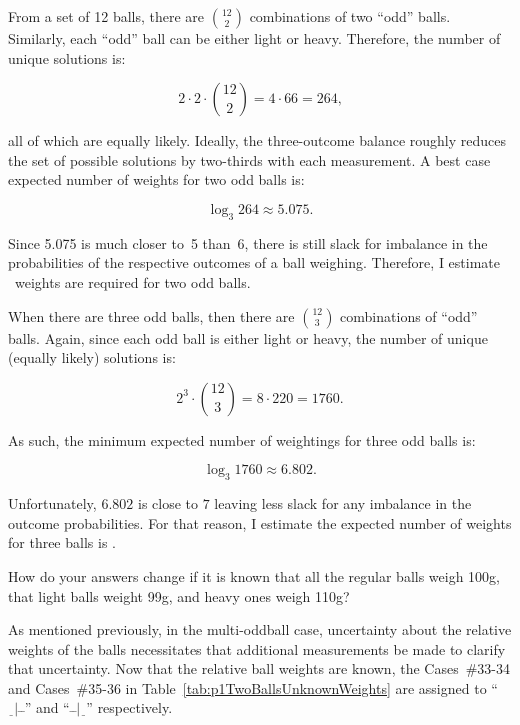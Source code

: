   From a set of 12 balls, there are $\binom{12}{2}$ combinations of two ``odd'' balls.  Similarly, each ``odd'' ball can be either light or heavy.  Therefore, the number of unique solutions is:

  \[ 2\cdot 2 \cdot \binom{12}{2} = 4 \cdot 66 = 264 \text{,} \]

  \noindent
  all of which are equally likely.  Ideally, the three-outcome balance roughly reduces the set of possible solutions by two-thirds with each measurement.  A best case expected number of weights for two odd balls is:

  \[ \log_{3} 264\approx 5.075 {.} \]

  Since 5.075 is much closer to~5 than~6, there is still slack for imbalance in the probabilities of the respective outcomes of a ball weighing.  Therefore, I estimate ~weights are required for two odd balls.

  When there are three odd balls, then there are $\binom{12}{3}$ combinations of ``odd'' balls.  Again, since each odd ball is either light or heavy, the number of unique (equally likely) solutions is:

  \[ 2^3 \cdot \binom{12}{3} = 8 \cdot 220 = 1760 \text{.} \]

  \noindent
  As such, the minimum expected number of weightings for three odd balls is:

  \[ \log_{3} 1760 \approx 6.802 \text{.} \]

  \noindent
  Unfortunately, $6.802$ is close to $7$ leaving less slack for any imbalance in the outcome probabilities.  For that reason, I estimate the expected number of weights for three balls is .

\begin{subproblem}
  How do your answers change if it is known that all the regular balls weigh 100g, that light balls weight 99g, and heavy ones weigh 110g?
\end{subproblem}

  As mentioned previously, in the multi-oddball case, uncertainty about the relative weights of the balls necessitates that additional measurements be made to clarify that uncertainty.  Now that the relative ball weights are known, the Cases~\#33-34 and Cases~\#35-36 in Table~\ref{tab:p1TwoBallsUnknownWeights} are assigned to ``${\underline{~~}|\bar{~}\bar{~}}$'' and ``${\bar{~}\bar{~}|\underline{~~}}$'' respectively.